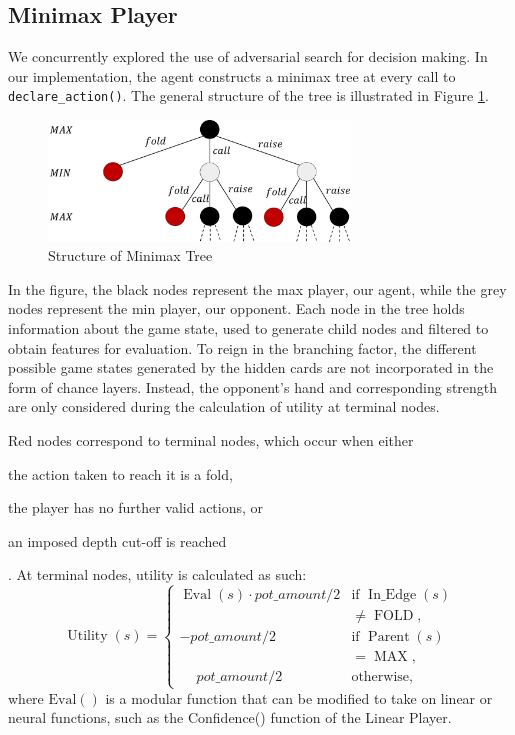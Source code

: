 \documentclass{article}
\begin{document}
\subsection{Minimax Player}
We concurrently explored the use of adversarial search for decision making.
In our implementation, the agent constructs a minimax tree at every call to \texttt{declare\_action()}. The general structure of the tree is illustrated in Figure \ref{minimaxtree}. 
\begin{figure}[h!]
\centering
\includegraphics[width=8cm]{MinimaxTree}
\caption{Structure of Minimax Tree}
\label{minimaxtree}
\end{figure}

In the figure, the black nodes represent the max player, our agent, while the grey nodes represent the min player, our opponent. Each node in the tree holds information about the game state, used to generate child nodes and filtered to obtain features for evaluation. To reign in the branching factor, the different possible game states generated by the hidden cards are not incorporated in the form of chance layers. Instead, the opponent's hand and corresponding strength are only considered during the calculation of utility at terminal nodes.

Red nodes correspond to terminal nodes, which occur when either \begin{enumerate*}[label=(\roman*)] \item the action taken to reach it is a fold, \item the player has no further valid actions, or \item an imposed depth cut-off is reached\end{enumerate*}. At terminal nodes, utility is calculated as such:
\[\operatorname{Utility}(s) = \begin{cases}
\operatorname{Eval}(s) \cdot pot\_amount/2 &\text{if } \operatorname{In\_Edge}(s)
\\&\neq \operatorname{FOLD},
\\-pot\_amount/2 & \text{if } \operatorname{Parent}(s) \\&= \operatorname{MAX},
\\\phantom{-} pot\_amount /2 & \text{otherwise,} 
\end{cases}\]
where \(\operatorname{Eval()}\) is a modular function that can be modified to take on linear or neural functions, such as the Confidence() function of the Linear Player.
\end{document}
